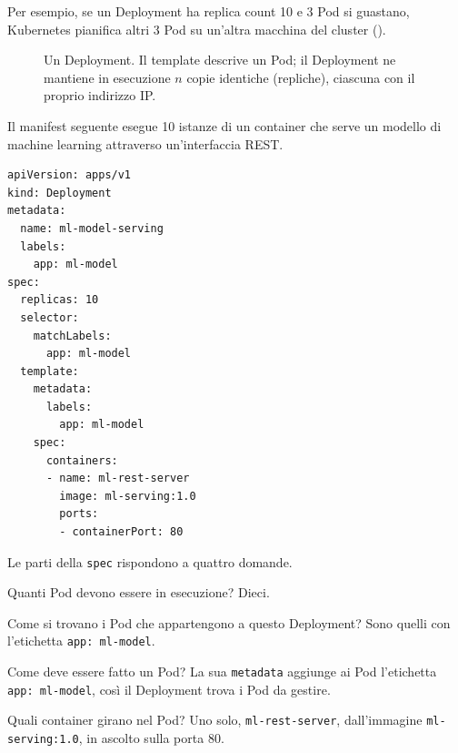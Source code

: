 Per esempio, se un Deployment ha replica count 10 e 3 Pod si guastano, Kubernetes pianifica altri 3 Pod su un'altra
macchina del cluster ().

\begin{figure}[ht]
\centering
{}
\caption{Un Deployment. Il template descrive un Pod; il Deployment ne mantiene in esecuzione $n$ copie identiche
(repliche), ciascuna con il proprio indirizzo IP.}
\label{fig:k8s-deployment}
\end{figure}

\begin{esempio}
Il manifest seguente esegue 10 istanze di un container che serve un modello di machine learning attraverso
un'interfaccia REST.
\begin{verbatim}
apiVersion: apps/v1
kind: Deployment
metadata:
  name: ml-model-serving
  labels:
    app: ml-model
spec:
  replicas: 10
  selector:
    matchLabels:
      app: ml-model
  template:
    metadata:
      labels:
        app: ml-model
    spec:
      containers:
      - name: ml-rest-server
        image: ml-serving:1.0
        ports:
        - containerPort: 80
\end{verbatim}
Le parti della \texttt{spec} rispondono a quattro domande.
\begin{description}[leftmargin=0pt, style=unboxed]
  \item[\texttt{replicas}.] Quanti Pod devono essere in esecuzione? Dieci.
  \item[\texttt{selector}.] Come si trovano i Pod che appartengono a questo Deployment? Sono quelli con l'etichetta
    \texttt{app: ml-model}.
  \item[\texttt{template}.] Come deve essere fatto un Pod? La sua \texttt{metadata} aggiunge ai Pod l'etichetta
    \texttt{app: ml-model}, così il Deployment trova i Pod da gestire.
  \item[\texttt{containers}.] Quali container girano nel Pod? Uno solo, \texttt{ml-rest-server}, dall'immagine
    \texttt{ml-serving:1.0}, in ascolto sulla porta 80.
\end{description}
\end{esempio}

